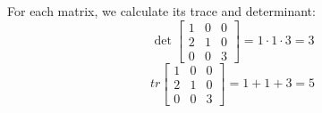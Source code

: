 For each matrix, we calculate its trace and determinant:
\begin{equation*}
    \det{\begin{bmatrix}
        1 & 0 & 0 \\
        2 & 1 & 0 \\
        0 & 0 & 3 
    \end{bmatrix}} = 1 \cdot 1 \cdot 3 = 3
\end{equation*}
\begin{equation*}
    tr{\begin{bmatrix}
        1 & 0 & 0 \\
        2 & 1 & 0 \\
        0 & 0 & 3 
    \end{bmatrix}} = 1 + 1 + 3 = 5
\end{equation*}
